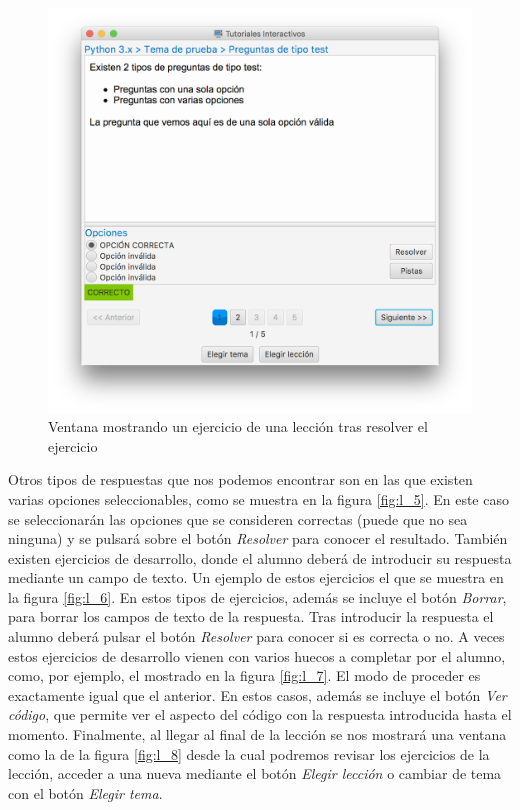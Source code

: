 \documentclass[]{article}
\begin{document}
%
\begin{figure}[tbp]
\begin{center}
\includegraphics[scale=0.35]{l_4.png}
\end{center}
\caption{Ventana mostrando un ejercicio de una lección tras resolver el ejercicio\label{fig:l_4}}
\end{figure}
%

Otros tipos de respuestas que nos podemos encontrar son en las que existen varias opciones seleccionables, como se muestra en la figura \ref{fig:l_5}. En este caso se seleccionarán las opciones que se consideren correctas (puede que no sea ninguna) y se pulsará sobre el botón \emph{Resolver} para conocer el resultado. También existen ejercicios de desarrollo, donde el alumno deberá de introducir su respuesta mediante un campo de texto. Un ejemplo de estos ejercicios el que se muestra en la figura \ref{fig:l_6}. En estos tipos de ejercicios, además se incluye el botón \emph{Borrar}, para borrar los campos de texto de la respuesta. Tras introducir la respuesta el alumno deberá pulsar el botón \emph{Resolver} para conocer si es correcta o no. A veces estos ejercicios de desarrollo vienen con varios huecos a completar por el alumno, como, por ejemplo, el mostrado en la figura \ref{fig:l_7}. El modo de proceder es exactamente igual que el anterior. En estos casos, además se incluye el botón \emph{Ver código}, que permite ver el aspecto del código con la respuesta introducida hasta el momento. Finalmente, al llegar al final de la lección se nos mostrará una ventana como la de la figura \ref{fig:l_8} desde la cual podremos revisar los ejercicios de la lección, acceder a una nueva mediante el botón \emph{Elegir lección} o cambiar de tema con el botón \emph{Elegir tema}. 
\end{document}
